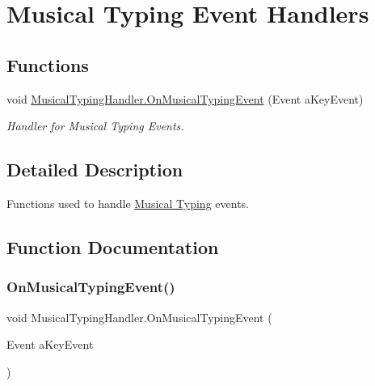 \hypertarget{group___mus_typ_handlers}{}\section{Musical Typing Event Handlers}
\label{group___mus_typ_handlers}
\subsection*{Functions}
\begin{DoxyCompactItemize}
\item 
void \hyperlink{group___mus_typ_handlers_ga391a3d207136b7eb0e734e289b520188}{Musical\+Typing\+Handler.\+On\+Musical\+Typing\+Event} (Event a\+Key\+Event)
\begin{DoxyCompactList}\small\item\em Handler for Musical Typing Events. \end{DoxyCompactList}\end{DoxyCompactItemize}


\subsection{Detailed Description}
Functions used to handle \hyperlink{group___mus_typ}{Musical Typing} events. 

\subsection{Function Documentation}
\mbox{\label{group___mus_typ_handlers_ga391a3d207136b7eb0e734e289b520188}} 
\subsubsection{\texorpdfstring{On\+Musical\+Typing\+Event()}{OnMusicalTypingEvent()}}
{\footnotesize\ttfamily void Musical\+Typing\+Handler.\+On\+Musical\+Typing\+Event (\begin{DoxyParamCaption}\item[{Event}]{a\+Key\+Event }\end{DoxyParamCaption})\hspace{0.3cm}{\ttfamily [private]}}



